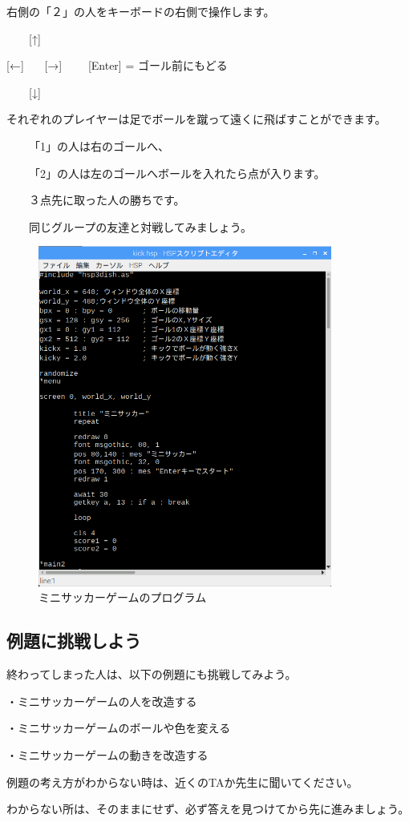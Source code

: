 右側の「２」の人をキーボードの右側で操作します。




\ \ \ \ [↑]

[←] \ \ \ [→] \ \ \ \ [Enter] = ゴール前にもどる

\ \ \ \ [↓]




それぞれのプレイヤーは足でボールを蹴って遠くに飛ばすことができます。

\ \ \ \ 「1」の人は右のゴールへ、

\ \ \ \ 「2」の人は左のゴールへボールを入れたら点が入ります。


\ \ \ \ ３点先に取った人の勝ちです。

\ \ \ \ 同じグループの友達と対戦してみましょう。



\begin{figure}[H]
    \begin{center}
      \includegraphics[keepaspectratio,width=9.657cm,height=11.229cm]{text04-img/text04-img006.png}
      \caption{ミニサッカーゲームのプログラム}
    \end{center}
    \label{fig:prog_menu}
\end{figure}


\newpage
\subsection{例題に挑戦しよう}

終わってしまった人は、以下の例題にも挑戦してみよう。


・ミニサッカーゲームの人を改造する

・ミニサッカーゲームのボールや色を変える

・ミニサッカーゲームの動きを改造する



例題の考え方がわからない時は、近くのTAか先生に聞いてください。

わからない所は、そのままにせず、必ず答えを見つけてから先に進みましょう。


